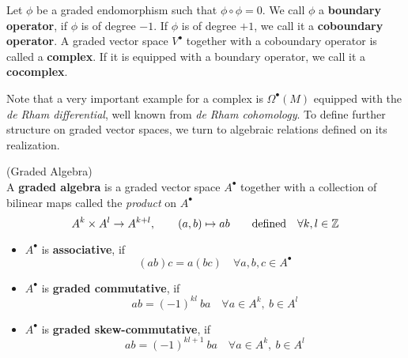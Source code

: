 \begin{definition}
  Let $\phi$ be a graded endomorphism such that $\phi \circ \phi = 0$. We call $\phi$ a \textbf{boundary operator}, if $\phi$ is of degree $-1$. If $\phi$ is of degree $+1$, we call it a \textbf{coboundary operator}. A graded vector space $V^\bullet$ together with a coboundary operator is called a \textbf{complex}. If it is equipped with a boundary operator, we call it a \textbf{cocomplex}.
\end{definition}

Note that a very important example for a complex is $\Omega^\bullet(M)$ equipped with the \emph{de Rham differential}, well known from \emph{de Rham cohomology}. To define further structure on graded vector spaces, we turn to algebraic relations defined on its realization.

\begin{definition} (Graded Algebra)\\
  A \textbf{graded algebra} is a graded vector space $A^\bullet$ together with a collection of bilinear maps called the \emph{product} on $A^\bullet$
  $$ A^k \times A^l \rightarrow A^{k+l}, \quad \quad (a,b) \mapsto ab \quad \quad \text{defined}\quad \forall k,l \in \mathbb{Z}$$
  \begin{itemize}
    \item $A^\bullet$ is \textbf{associative}, if
    $$ (ab)c = a(bc) \quad \forall a,b,c \in A^\bullet $$

    \item $A^\bullet$ is \textbf{graded commutative}, if
    $$ ab = (-1)^{kl}\ ba \quad \forall a \in A^k, \ b\in A^l $$

    \item $A^\bullet$ is \textbf{graded skew-commutative}, if
    $$ ab = (-1)^{kl+1}\ ba \quad \forall a \in A^k, \ b\in A^l $$
  \end{itemize}
\end{definition}

